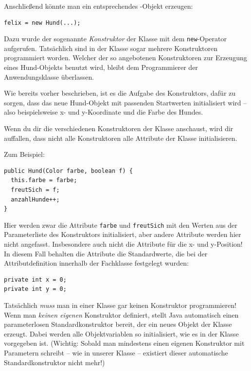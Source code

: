 Anschließend könnte man ein entsprechendes -Objekt erzeugen:

\begin{lstlisting}
felix = new Hund(...);
\end{lstlisting}

Dazu wurde der sogenannte \emph{Konstruktor} der Klasse mit dem
\lstinline|new|-Operator aufgerufen. Tatsächlich sind in der Klasse
 sogar mehrere Konstruktoren programmiert worden. Welcher der
so angebotenen Konstruktoren zur Erzeugung eines Hund-Objekts benutzt wird,
bleibt dem Programmierer der Anwendungsklasse überlassen.

Wie bereits vorher beschrieben, ist es die Aufgabe des Konstruktors, dafür zu
sorgen, dass das neue Hund-Objekt mit passenden Startwerten initialisiert wird --
also beispielsweise x- und y-Koordinate und die Farbe des Hundes.

Wenn du dir die verschiedenen Konstruktoren der Klasse  anschaust,
wird dir auffallen, dass nicht alle Konstruktoren alle Attribute der Klasse
initialisieren.

Zum Beispiel:

\begin{lstlisting}
public Hund(Color farbe, boolean f) {
  this.farbe = farbe;
  freutSich = f;
  anzahlHunde++;
}
\end{lstlisting}

Hier werden zwar die Attribute \lstinline|farbe| und \lstinline|freutSich|
mit den Werten aus der Parameterliste des Konstruktors initialisiert, aber andere
Attribute werden hier nicht angefasst. Insbesondere auch nicht die Attribute für
die x- und y-Position! In diesem Fall behalten die Attribute die Standardwerte,
die bei der Attributdefinition innerhalb der Fachklasse festgelegt wurden:

\begin{lstlisting}
private int x = 0;
private int y = 0;
\end{lstlisting}

Tatsächlich \emph{muss} man in einer Klasse gar keinen Konstruktor programmieren!
Wenn man \emph{keinen eigenen} Konstruktor definiert, stellt Java automatisch einen
parameterlosen Standardkonstruktor bereit, der ein neues Objekt der Klasse erzeugt.
Dabei werden alle Objektvariablen so initialisiert, wie es in der Klasse vorgegeben ist.
(Wichtig: Sobald man mindestens einen eigenen Konstruktor mit Parametern schreibt -- wie in
unserer Klasse  -- existiert dieser automatische Standardkonstruktor nicht mehr!)

